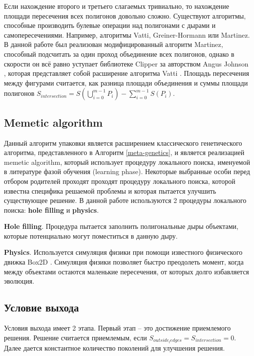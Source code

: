 \documentclass{fefu_thesis/cls/fefu}
\newcommand*\talgref[1]{Алгоритм \ref{#1}}
\begin{document}
    Если нахождение второго и третьего слагаемых тривиально, то нахождение площади пересечения всех полигонов довольно сложно. Существуют алгоритмы, способные производить булевые операции над полигонами с дырами и самопересечениями. Например, алгоритмы Vatti\cite{Vatti}, Greiner-Hormann\cite{GreinerHormann} или Martinez\cite{Martinez}. В данной работе был реализован модифицированный алгоритм Martinez\cite{Martinez}, способный подсчитать за один проход объединение всех полигонов, однако в скорости он всё равно уступает библиотеке Clipper за авторством Angus Johnson \cite{Clipper}, которая представляет собой расширение алгоритма Vatti \cite{Vatti}. Площадь пересечения между фигурами считается, как разница площади объединения и суммы площади полигонов $S_{intersection} = S\left(\bigcup\limits_{i = 0}^{m - 1} P_i\right) - \sum\limits_{i = 0}^{m - 1}S\left(P_i\right)$.

    \subsection{Memetic algorithm}
    Данный алгоритм упаковки является расширением классического генетического алгоритма, представленного в \talgref{meta-genetics}, и является реализацией memetic algorithm, который использует процедуру локального поиска, именуемой в литературе фазой обучения (learning phase). Некоторые выбранные особи перед отбором родителей проходят проходят процедуру локального поиска, которой известна специфика решаемой проблемы и которая пытается улучшить существующее решение. В данной работе используются 2 процедуры локального поиска: \textbf{hole filling} и \textbf{physics}.

    \textbf{Hole filling}. Процедура пытается заполнить полигональные дыры объектами, которые потенциально могут поместиться в данную дыру.

    \textbf{Physics}. Используется симуляция физики при помощи известного физического движка Box2D \cite{Box2D}. Симуляция физики позволяет быстро преодолеть момент, когда между объектами остаются маленькие пересечения, от которых долго избавляется эволюция.

    \subsection{Условие выхода}
    Условия выхода имеет 2 этапа. Первый этап -- это достижение приемлемого решения. Решение считается приемлемым, если $S_{outside_ledges} = S_{intersection} = 0$. Далее дается константное количество поколений для улучшения решения.
    \newpage
    \printbibliography
\end{document}
